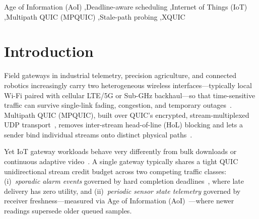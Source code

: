 \documentclass[preprint,12pt,number]{elsarticle}
\begin{document}
\begin{frontmatter}
\begin{keyword}
Age of Information (AoI) \sep Deadline-aware scheduling \sep Internet of Things (IoT) \sep Multipath QUIC (MPQUIC) \sep Stale-path probing \sep XQUIC
\end{keyword}

\end{frontmatter}

\linenumbers

\section{Introduction}
\label{sec:intro}

Field gateways in industrial telemetry, precision agriculture, and connected robotics increasingly carry two heterogeneous wireless interfaces---typically local Wi-Fi paired with cellular LTE/5G or Sub-GHz backhaul---so that time-sensitive traffic can survive single-link fading, congestion, and temporary outages~\cite{deconinck2017mpquic,kahraman2024survey}. Multipath QUIC (MPQUIC), built over QUIC's encrypted, stream-multiplexed UDP transport~\cite{rfc9000,rfc9002}, removes inter-stream head-of-line (HoL) blocking and lets a sender bind individual streams onto distinct physical paths~\cite{zheng2021xlink,yang2024mams}.

Yet IoT gateway workloads behave very differently from bulk downloads or continuous adaptive video~\cite{guo2017dems,zheng2021xlink}. A single gateway typically shares a tight QUIC unidirectional stream credit budget across two competing traffic classes: (i)~\emph{sporadic alarm events} governed by hard completion deadlines~\cite{liu1973scheduling,chen2024damps}, where late delivery has zero utility, and (ii)~\emph{periodic sensor state telemetry} governed by receiver freshness---measured via Age of Information (AoI)~\cite{kaul2012realtime,yates2021age}---where newer readings supersede older queued samples.
\end{document}
